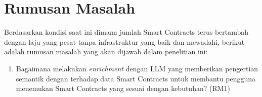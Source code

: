 \section{Rumusan Masalah}
\label{sec:rumusan-masalah}

Berdasarkan kondisi saat ini dimana jumlah Smart Contracts terus bertambah dengan laju yang pesat tanpa infrastruktur yang baik dan mewadahi, berikut adalah rumusan masalah yang akan dijawab dalam penelitian ini:
\begin{enumerate}



	\item Bagaimana melakukan \textit{enrichment} dengan LLM yang memberikan pengertian semantik dengan terhadap data Smart Contracts untuk membantu pengguna menemukan Smart Contracts yang sesuai dengan kebutuhan? (RM1)


\end{enumerate}
